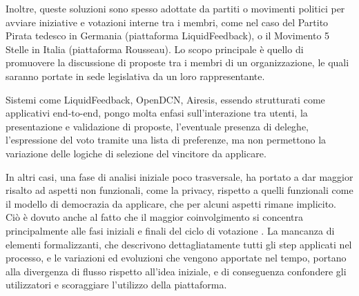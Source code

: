 \documentclass[12pt,a4paper,openright,twoside]{book}
\begin{document}
Inoltre, queste soluzioni sono spesso adottate da partiti o movimenti politici per avviare iniziative
e votazioni interne tra i membri, come nel caso del Partito Pirata tedesco in Germania (piattaforma LiquidFeedback),
o il Movimento 5 Stelle in Italia (piattaforma Rousseau). Lo scopo principale è quello di promuovere la discussione
di proposte tra i membri di un organizzazione, le quali saranno portate in sede legislativa da un loro rappresentante\cite{korthagen2020non}.

Sistemi come LiquidFeedback, OpenDCN, Airesis, essendo strutturati come applicativi end-to-end,
pongo molta enfasi sull'interazione tra utenti, la presentazione e validazione di proposte,
l'eventuale presenza di deleghe, l'espressione del voto tramite una lista di preferenze, ma
non permettono la variazione delle logiche di selezione del vincitore da applicare\cite{Trapanese:2018}.

In altri casi, una fase di analisi iniziale poco trasversale, ha portato a dar maggior risalto
ad aspetti non funzionali, come la privacy, rispetto a quelli funzionali come il modello di democrazia
da applicare, che per alcuni aspetti rimane implicito\cite{Pianini:2019}.
Ciò è dovuto anche al fatto che il maggior coinvolgimento si concentra 
principalmente alle fasi iniziali e finali del ciclo di votazione \cite{hennen2020european}.
La mancanza di elementi formalizzanti, che descrivono dettagliatamente tutti gli step applicati nel
processo, e le variazioni ed evoluzioni che vengono apportate nel tempo, portano alla divergenza di flusso rispetto all'idea iniziale, 
e di conseguenza confondere gli utilizzatori e scoraggiare l'utilizzo della piattaforma\cite{Pianini:2019}.
\end{document}
